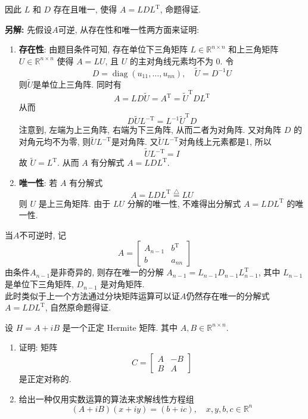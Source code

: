 \documentclass[12pt, answers]{exam}     %
\newcommand{\anothersolution}{\par\noindent\textbf{另解:}}
\newcommand{\R}{\mathbb{R}}
\newcommand{\T}{\mathrm{T}}
\begin{document}
\begin{questions}
\begin{solution}
\begin{enumerate}
因此 \( L \) 和 \( D \) 存在且唯一, 使得 \( A = LDL^{\T} \), 命题得证. 
\end{enumerate} 
\anothersolution{}
先假设$A$可逆, 从存在性和唯一性两方面来证明:
\begin{enumerate}
    \item \textbf{存在性}: 
    由题目条件可知, 存在单位下三角矩阵 \( L \in \R^{n \times n} \) 和上三角矩阵 \( U \in \R^{n \times n} \) 使得 \( A = LU \), 且 \( U \) 的主对角线元素均不为 0. 令
    \[
    D = \operatorname{diag}(u_{11}, \ldots, u_{nn}), \quad \widetilde{U} = D^{-1}U
    \]
    则$\widetilde{U}$是单位上三角阵. 同时有
    \[
    A = L D \widetilde{U} = A^{\T} = \widetilde{U}^{\T} D L^{\T}    
    \]
    从而
    \[
    D \widetilde{U} L^{-\T} = L^{-1} \widetilde{U}^{\T} D
    \]
    注意到, 左端为上三角阵, 右端为下三角阵, 从而二者为对角阵. 又对角阵 \( D \) 的对角元均不为零, 则$\widetilde{U}L^{-\T}$是对角阵. 又$\widetilde{U}L^{-\T}$对角线上元素都是1, 所以
    \[
    \widetilde{U} L^{-\T} = I
    \]
    故 \( \widetilde{U} = L^{\T} \). 从而 \( A \) 有分解式 \( A = LDL^{\T} \). 

    \item \textbf{唯一性}: 
    若 \( A \) 有分解式
    \[
    A = LDL^{\T} \overset{\triangle}{=} LU
    \]
    则 \( U \) 是上三角矩阵. 由于 \( LU \) 分解的唯一性, 不难得出分解式 \( A = LDL^{\T} \) 的唯一性. 
\end{enumerate}
当$A$不可逆时, 记
\[
A = \begin{bmatrix}
    A_{n-1} & b^{\T} \\
    b & a_{nn}
\end{bmatrix}
\] 
由条件$A_{n-1}$是非奇异的, 则存在唯一的分解 $A_{n-1} = L_{n-1} D_{n-1} L_{n-1}^{\T}$, 其中 $L_{n-1}$ 是单位下三角矩阵, $D_{n-1}$ 是对角矩阵. \\
此时类似于上一个方法通过分块矩阵运算可以证$A$仍然存在唯一的分解式$A=LDL^{\T}$, 自然原命题得证.
\end{solution}

\question{}
设 \( H = A + iB \) 是一个正定 Hermite 矩阵. 其中 \( A, B \in \mathbb{R}^{n \times n} \).
\begin{enumerate}[label=(\arabic*)]
\item 证明: 矩阵
\[
C =
\begin{bmatrix}
A & -B \\
B & A
\end{bmatrix}
\]
是正定对称的.

\item 给出一种仅用实数运算的算法来求解线性方程组
\[
(A + iB)(x + iy) = (b + ic), \quad x, y, b, c \in \mathbb{R}^n
\]
\end{enumerate}


\end{questions}
\end{document}

